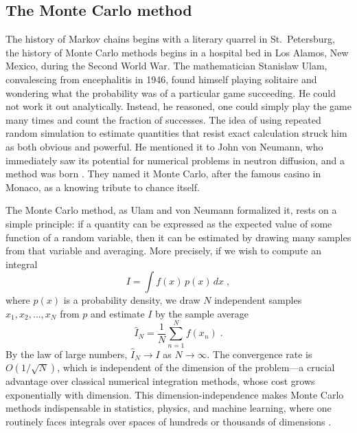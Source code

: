\subsection{The Monte Carlo method}

The history of Markov chains begins with a literary quarrel in St.\ Petersburg, the history of Monte Carlo methods begins in a hospital bed in Los Alamos, New Mexico, during the Second World War. The mathematician Stanislaw Ulam, convalescing from encephalitis in 1946, found himself playing solitaire and wondering what the probability was of a particular game succeeding. He could not work it out analytically. Instead, he reasoned, one could simply play the game many times and count the fraction of successes. The idea of using repeated random simulation to estimate quantities that resist exact calculation struck him as both obvious and powerful. He mentioned it to John von Neumann, who immediately saw its potential for numerical problems in neutron diffusion, and a method was born \cite{ulam_1976_adventures}. They named it Monte Carlo, after the famous casino in Monaco, as a knowing tribute to chance itself.

\medskip

The Monte Carlo method, as Ulam and von Neumann formalized it, rests on a simple principle: if a quantity can be expressed as the expected value of some function of a random variable, then it can be estimated by drawing many samples from that variable and averaging. More precisely, if we wish to compute an integral
\begin{equation}
    I = \int f(x)\, p(x)\, dx \; ,
\end{equation}
where $p(x)$ is a probability density, we draw $N$ independent samples $x_1, x_2, \dots, x_N$ from $p$ and estimate $I$ by the sample average
\begin{equation}
    \hat{I}_N = \frac{1}{N} \sum_{n=1}^{N} f(x_n) \; .
\end{equation}
By the law of large numbers, $\hat{I}_N \to I$ as $N \to \infty$. The convergence rate is $O(1/\sqrt{N})$, which is independent of the dimension of the problem---a crucial advantage over classical numerical integration methods, whose cost grows exponentially with dimension. This dimension-independence makes Monte Carlo methods indispensable in statistics, physics, and machine learning, where one routinely faces integrals over spaces of hundreds or thousands of dimensions \cite{metropolis_1949_monte}.

